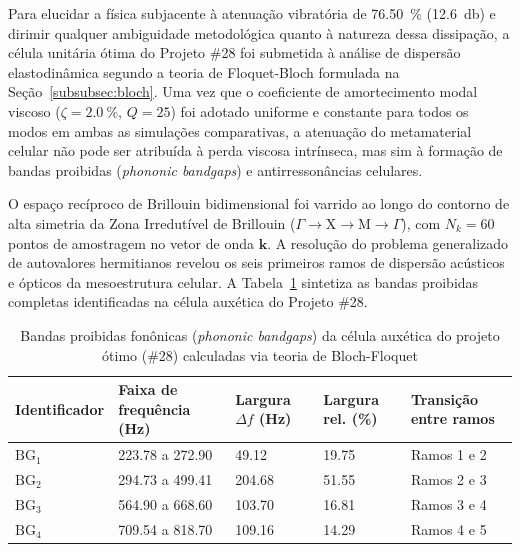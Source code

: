 Para elucidar a física subjacente à atenuação vibratória de \SI{76.50}{\percent} (\SI{12.6}{\decibel}) e dirimir qualquer ambiguidade metodológica quanto à natureza dessa dissipação, a célula unitária ótima do Projeto \#28 foi submetida à análise de dispersão elastodinâmica segundo a teoria de Floquet-Bloch formulada na Seção~\ref{subsubsec:bloch}. Uma vez que o coeficiente de amortecimento modal viscoso ($\zeta = \SI{2.0}{\percent}$, $Q = 25$) foi adotado uniforme e constante para todos os modos em ambas as simulações comparativas, a atenuação do metamaterial celular não pode ser atribuída à perda viscosa intrínseca, mas sim à formação de bandas proibidas (\textit{phononic bandgaps}) e antirressonâncias celulares.

O espaço recíproco de Brillouin bidimensional foi varrido ao longo do contorno de alta simetria da Zona Irredutível de Brillouin ($\Gamma \to \mathrm{X} \to \mathrm{M} \to \Gamma$), com $N_k = 60$ pontos de amostragem no vetor de onda $\mathbf{k}$. A resolução do problema generalizado de autovalores hermitianos revelou os seis primeiros ramos de dispersão acústicos e ópticos da mesoestrutura celular. A Tabela~\ref{tab:bandgaps-bloch} sintetiza as bandas proibidas completas identificadas na célula auxética do Projeto \#28.

\begin{table}[htb]
  \caption{Bandas proibidas fonônicas (\textit{phononic bandgaps}) da célula auxética do projeto ótimo (\#28) calculadas via teoria de Bloch-Floquet}
  \label{tab:bandgaps-bloch}
  \footnotesize
  \SingleSpacing
  \begin{tabularx}{\textwidth}{@{}>{\raggedright\arraybackslash}p{2.2cm} >{\centering\arraybackslash}p{3.2cm} >{\centering\arraybackslash}p{3.0cm} >{\centering\arraybackslash}p{2.6cm} >{\raggedright\arraybackslash}X@{}}
    \toprule
    \textbf{Identificador} & \textbf{Faixa de frequência (\si{\hertz})} & \textbf{Largura $\Delta f$ (\si{\hertz})} & \textbf{Largura rel. (\si{\percent})} & \textbf{Transição entre ramos} \\
    \midrule
    $\text{BG}_1$ & \num{223.78} a \num{272.90} & \num{49.12}  & \num{19.75} & Ramos 1 e 2 \\
    $\text{BG}_2$ & \num{294.73} a \num{499.41} & \num{204.68} & \num{51.55} & Ramos 2 e 3 \\
    $\text{BG}_3$ & \num{564.90} a \num{668.60} & \num{103.70} & \num{16.81} & Ramos 3 e 4 \\
    $\text{BG}_4$ & \num{709.54} a \num{818.70} & \num{109.16} & \num{14.29} & Ramos 4 e 5 \\
    \bottomrule
  \end{tabularx}
\end{table}

